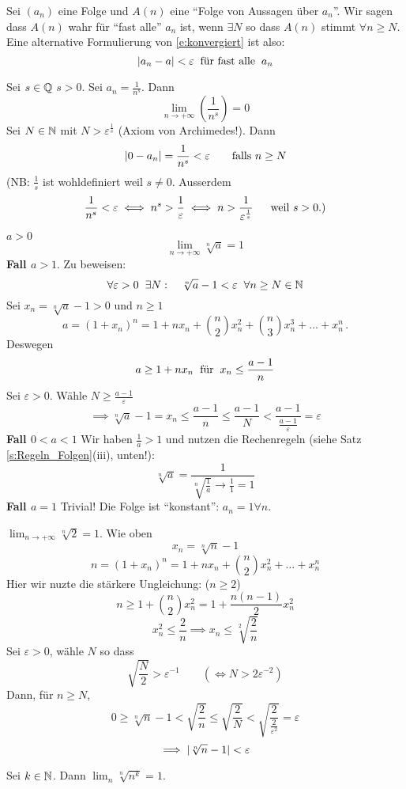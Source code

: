\begin{Def}
  Sei $(a_n)$ eine Folge und $A(n)$ eine ``Folge von Aussagen über $a_n$''. 
Wir sagen dass $A(n)$ wahr für ``fast alle'' $a_n$ ist, wenn $\exists N$ so dass $A(n)$ 
stimmt $\forall n\geq N$. Eine alternative Formulierung von \eqref{e:konvergiert} ist also:
  \[\mathopen| a_n-a \mathclose|<\varepsilon\hspace{2mm}\text{f\"ur fast alle}\hspace{2mm} a_n\]
\end{Def}
\begin{Bsp}
  Sei $s\in\mathbb{Q}$ $s>0$. Sei $a_n=\frac{1}{n^s}$. Dann
  \[\lim_{n\to+\infty}\left( \frac{1}{n^s} \right)=0\]
  Sei $N\in \mathbb{N}$ mit $N>\varepsilon^{\frac{1}{s}}$ (Axiom von Archimedes!). Dann
  \[\mathopen| 0-a_n \mathclose|=\frac{1}{n^s}<\varepsilon\qquad \mbox{falls $n\geq N$}\]
(NB: $\frac{1}{s}$ ist wohldefiniert weil $s\neq 0$. Ausserdem
\[\frac{1}{n^s}<\varepsilon \iff n^s>\frac{1}{\varepsilon}\iff n>
\frac{1}{\varepsilon^{\frac{1}{s}}}\quad\hspace{2mm}\text{weil $s> 0$.)}\]
\end{Bsp}
\begin{Bsp}
  $a>0$
  \[\lim_{n\to+\infty}\sqrt[n]{a}=1\]
  {\bf Fall $a>1$}. Zu beweisen:
  \[\forall \varepsilon>0 \hspace{2mm}\exists N:\quad \sqrt[n]{a}-1<\varepsilon\hspace{2mm}\forall n\geq N\in\mathbb{N}\]
  Sei $x_n=\sqrt[n]{a}-1>0$ und $n\geq 1$
  \[a=(1+x_n)^n=1+nx_n+\binom{n}{2}x^2_n+\binom{n}{3}x_n^3+\dots+x_n^n\, .\]
  Deswegen\[a\geq 1+nx_n\hspace{2mm}\text{für}\hspace{2mm} x_n\leq\frac{a-1}{n}\]
  Sei $\varepsilon>0$. Wähle $N\geq \frac{a-1}{\varepsilon}$
  \[\implies\sqrt[n]{a}-1=x_n\leq\frac{a-1}{n}\leq\frac{a-1}{N}<\frac{a-1}{\frac{a-1}{\varepsilon}}=
  \varepsilon\]
  {\bf Fall $0<a<1$} Wir haben $\frac{1}{a}>1$ und nutzen die Rechenregeln (siehe Satz 
\ref{s:Regeln_Folgen}(iii), unten!):
\[\sqrt[n]{a}=\frac{1}{\sqrt[n]{\frac{1}{a}} \to \frac{1}{1} = 1}\]
 {\bf Fall $a=1$} Trivial! Die Folge ist ``konstant'': $a_n=1 \forall n$.
\end{Bsp}
\begin{Bsp}
  $\lim_{n\to+\infty}\sqrt[n]{2} =1$. Wie oben
  \[x_n=\sqrt[n]{n}-1\]
  \[n=(1+x_n)^n=1+nx_n+\binom{n}{2}x_n^2+\dots+x_n^n\]
Hier wir nuzte die st\"arkere Ungleichung: ($n\geq 2$)
\[n\geq1+\binom{n}{2} x_n^2=1+\frac{n(n-1)}{2}x_n^2 \]
\[x_n^2\leq\frac{2}{n}\implies x_n\leq \sqrt[2]{\frac{2}{n}}\]
Sei $\varepsilon>0$, wähle $N$ so dass
  \[\sqrt{\frac{N}{2}}>\varepsilon^{-1}\qquad (\iff N> 2\varepsilon^{-2})\]
Dann, f\"ur $n\geq N$,
  \[0\geq\sqrt[n]{n}-1<\sqrt{\frac{2}{n}}\leq\sqrt{\frac{2}{N}}<\sqrt{\frac{2}{\frac{2}{\varepsilon^2}}}=\varepsilon\]
  \[\implies \mathopen| \sqrt[n]{n}-1 \mathclose|<\varepsilon\]
\end{Bsp}
\begin{Ueb} Sei $k\in \mathbb{N}$. Dann $\lim_n \sqrt[n]{n^k} =1$.
\end{Ueb}
